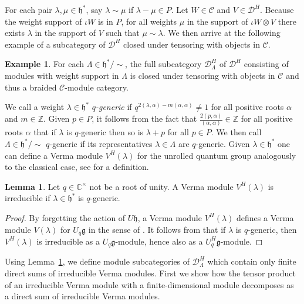 \documentclass[12pt,dvipsnames]{article}
\numberwithin{equation}{section}
\theoremstyle{definition}
\newtheorem{lemma}[definition]{Lemma}
\newtheorem{example}[definition]{Example}
\newcommand{\cat}[1]{\mathcal{#1}}
\newcommand{\C}{\ensuremath{\mathbb{C}}}
\newcommand{\Z}{\ensuremath{\mathbb{Z}}}
\newcommand{\1}{\ensuremath{\mathbbm{1}}}
\begin{document}
For each pair $\lambda,\mu\in\mathfrak{h}^\ast$, say $\lambda\sim\mu$ if $\lambda-\mu\in P$. Let $W\in\cat{C}$ and $V\in\cat{D}^H$. Because the weight support of $\iota W$ is in $P$, for all weights $\mu$ in the support of $\iota W\otimes V$ there exists $\lambda$ in the support of $V$ such that $\mu\sim\lambda$. We then arrive at the following example of a subcategory of $\cat{D}^H$ closed under tensoring with objects in $\cat{C}$.
\begin{example}\label{ex:WeylOrbit}
    For each $\Lambda\in\mathfrak{h}^\ast/\sim$, the full subcategory $\cat{D}^H_\Lambda$ of $\cat{D}^H$ consisting of modules with weight support in $\Lambda$ is closed under tensoring with objects in $\cat{C}$ and thus a braided $\cat{C}$-module category.
\end{example}
We call a weight $\lambda\in\mathfrak{h}^\ast$ \emph{$q$-generic} if  $q^{2(\lambda,\alpha)-m(\alpha,\alpha)} \neq 1$  for all positive roots $\alpha$ and $m\in\Z$. Given $p\in P$, it follows from the fact that $\frac{2(p,\alpha)}{(\alpha,\alpha)}\in\Z$ for all positive roots $\alpha$ that if $\lambda$ is $q$-generic then so is $\lambda+p$ for all $p\in P$. We then call $\Lambda\in\mathfrak{h}^\ast/\sim$ $q$-generic if its representatives $\lambda\in\Lambda$ are $q$-generic. Given $\lambda\in\mathfrak{h}^\ast$ one can define a Verma module $V^H(\lambda)$ for the unrolled quantum group analogously to the classical case, see \cite[Sec.\,5.5]{GP10} for a definition. 
\begin{lemma}\label{lem: q-generic implies irreducible}
    Let $q\in\C^\times$ not be a root of unity. A Verma module $V^H(\lambda)$ is irreducible if $\lambda\in\mathfrak{h}^\ast$ is $q$-generic.
\end{lemma}
\begin{proof}
    By forgetting the action of $U\mathfrak{h}$, a Verma module $V^H(\lambda)$ defines a Verma module $V(\lambda)$ for $U_q\mathfrak{g}$ in the sense of \cite[Sec.\,1.9]{DK90}. 
It follows from \cite[Cor.\,1.9]{DK90} that if $\lambda$ is $q$-generic, then $V^H(\lambda)$ is irreducible as a $U_q\mathfrak{g}$-module, hence also as a $U_q^H\mathfrak{g}$-module.
\end{proof}

Using Lemma~\ref{lem: q-generic implies irreducible}, we define module subcategories of $\cat{D}^H_\Lambda$ which contain only finite direct sums of irreducible Verma modules.  First we show how the tensor product of an irreducible Verma module with a finite-dimensional module decomposes as a direct sum of irreducible Verma modules.
\end{document}
